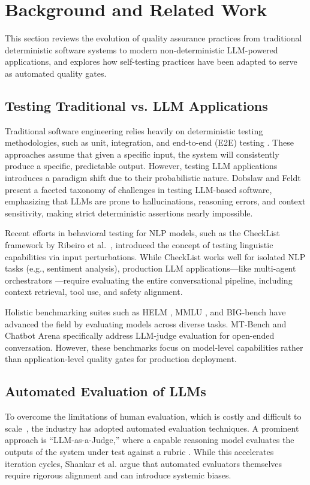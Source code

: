 \section{Background and Related Work}
\label{sec:related-work}

This section reviews the evolution of quality assurance practices from traditional deterministic software systems to modern non-deterministic LLM-powered applications, and explores how self-testing practices have been adapted to serve as automated quality gates.

\subsection{Testing Traditional vs. LLM Applications}
Traditional software engineering relies heavily on deterministic testing methodologies, such as unit, integration, and end-to-end (E2E) testing \cite{wohlin2012experimentation}. These approaches assume that given a specific input, the system will consistently produce a specific, predictable output. However, testing LLM applications introduces a paradigm shift due to their probabilistic nature. Dobslaw and Feldt \cite{dobslaw2025testing} present a faceted taxonomy of challenges in testing LLM-based software, emphasizing that LLMs are prone to hallucinations, reasoning errors, and context sensitivity, making strict deterministic assertions nearly impossible.

Recent efforts in behavioral testing for NLP models, such as the CheckList framework by Ribeiro et al.~\cite{ribeiro2020beyond}, introduced the concept of testing linguistic capabilities via input perturbations. While CheckList works well for isolated NLP tasks (e.g., sentiment analysis), production LLM applications---like multi-agent orchestrators \cite{wu2024autogen, hong2024metagpt}---require evaluating the entire conversational pipeline, including context retrieval, tool use, and safety alignment.

Holistic benchmarking suites such as HELM \cite{liang2023helm}, MMLU \cite{hendrycks2021mmlu}, and BIG-bench \cite{srivastava2023bigbench} have advanced the field by evaluating models across diverse tasks. MT-Bench and Chatbot Arena \cite{zheng2023judging} specifically address LLM-judge evaluation for open-ended conversation. However, these benchmarks focus on model-level capabilities rather than application-level quality gates for production deployment.

\subsection{Automated Evaluation of LLMs}
To overcome the limitations of human evaluation, which is costly and difficult to scale~\cite{nushi2017human}, the industry has adopted automated evaluation techniques. A prominent approach is ``LLM-as-a-Judge,'' where a capable reasoning model evaluates the outputs of the system under test against a rubric \cite{zheng2023judging}. While this accelerates iteration cycles, Shankar et al. \cite{shankar2024who} argue that automated evaluators themselves require rigorous alignment and can introduce systemic biases.

